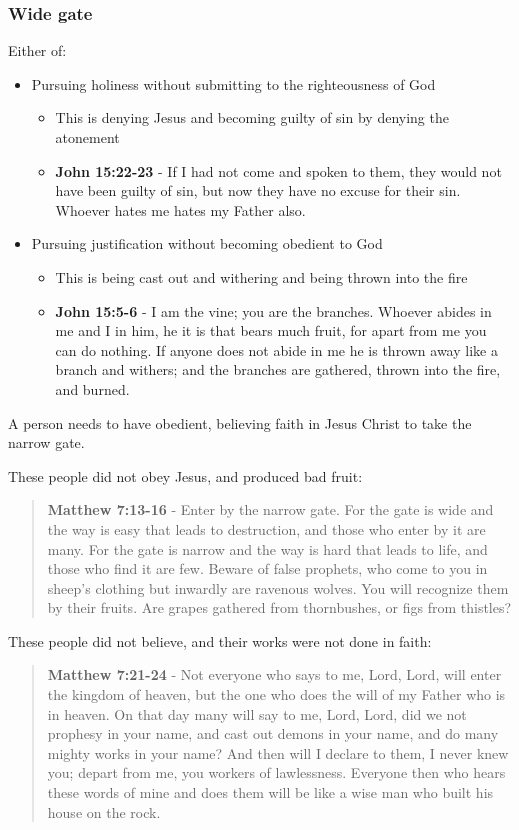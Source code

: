 \documentclass[11pt]{article}
\begin{document}
\subsubsection{Wide gate}
\label{sec:orgc49bd04}
Either of:
\begin{itemize}
\item Pursuing holiness without submitting to the righteousness of God
\begin{itemize}
\item This is denying Jesus and becoming guilty of sin by denying the atonement
\item \textbf{John 15:22-23} - If I had not come and spoken to them, they would not have been guilty of sin, but now they have no excuse for their sin. Whoever hates me hates my Father also.
\end{itemize}
\item Pursuing justification without becoming obedient to God
\begin{itemize}
\item This is being cast out and withering and being thrown into the fire
\item \textbf{John 15:5-6} - I am the vine; you are the branches. Whoever abides in me and I in him, he it is that bears much fruit, for apart from me you can do nothing. If anyone does not abide in me he is thrown away like a branch and withers; and the branches are gathered, thrown into the fire, and burned.
\end{itemize}
\end{itemize}

A person needs to have obedient, believing faith in Jesus Christ to take the narrow gate.

These people did not obey Jesus, and produced bad fruit:

\begin{quote}
\textbf{Matthew 7:13-16} - Enter by the narrow gate. For the gate is wide and the way is easy that leads to destruction, and those who enter by it are many. For the gate is narrow and the way is hard that leads to life, and those who find it are few. Beware of false prophets, who come to you in sheep's clothing but inwardly are ravenous wolves. You will recognize them by their fruits. Are grapes gathered from thornbushes, or figs from thistles?
\end{quote}

These people did not believe, and their works were not done in faith:

\begin{quote}
\textbf{Matthew 7:21-24} - Not everyone who says to me, Lord, Lord, will enter the kingdom of heaven, but the one who does the will of my Father who is in heaven. On that day many will say to me, Lord, Lord, did we not prophesy in your name, and cast out demons in your name, and do many mighty works in your name? And then will I declare to them, I never knew you; depart from me, you workers of lawlessness. Everyone then who hears these words of mine and does them will be like a wise man who built his house on the rock.
\end{quote}
\end{document}
